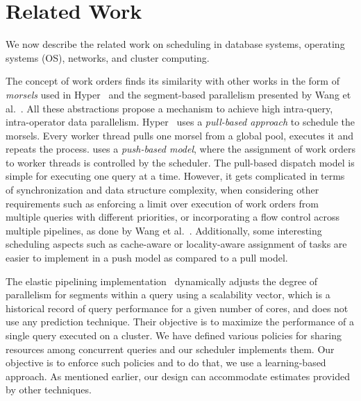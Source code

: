 \section{Related Work}\label{sec:related}
We now describe the related work on scheduling in database systems, operating systems (OS), networks, and cluster computing. 

The concept of work orders finds its similarity with other works in the form of \textit{morsels} used in Hyper~\cite{morsel} and the segment-based parallelism presented by Wang et al.~\cite{wang2016elastic}. 
All these abstractions propose a mechanism to achieve high intra-query, intra-operator data parallelism.
Hyper~\cite{morsel} uses a \textit{pull-based approach} to schedule the morsels. 
Every worker thread pulls one morsel from a global pool, executes it and repeats the process.
\sys{} uses a \textit{push-based model}, where the assignment of work orders to worker threads is controlled by the scheduler.
The pull-based dispatch model is simple for executing one query at a time. 
However, it gets complicated in terms of synchronization and data structure complexity, when considering other requirements such as enforcing a limit over execution of work orders from multiple queries with different priorities, or incorporating a flow control across multiple pipelines, as done by Wang et al.~\cite{wang2016elastic}.
Additionally, some interesting scheduling aspects such as cache-aware or locality-aware assignment of tasks are easier to implement in a push model as compared to a pull model.

The elastic pipelining implementation~\cite{wang2016elastic} dynamically adjusts the degree of parallelism for segments within a query using a scalability vector, which is a historical record of query performance for a given number of cores, and does not use any prediction technique.
Their objective is to maximize the performance of a single query executed on a cluster.
We have defined various policies for sharing resources among concurrent queries and our scheduler implements them. 
Our objective is to enforce such policies and to do that, we use a learning-based approach.
As mentioned earlier, our design can accommodate estimates provided by other techniques.

